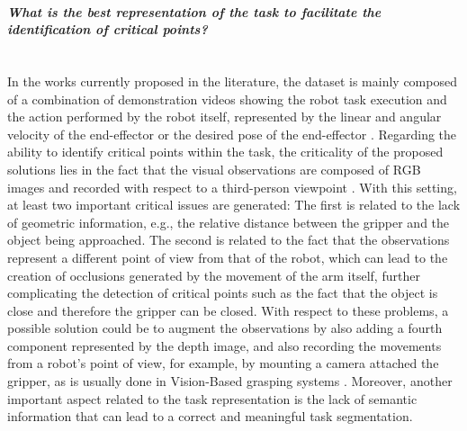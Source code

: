 \paragraph{\textit{What is the best representation of the task to facilitate the identification of critical points?}}  \mbox{} \\
In the works currently proposed in the literature, the dataset is mainly composed of a combination of demonstration videos showing the robot task execution and the action performed by the robot itself, represented by the linear and angular velocity of the end-effector \cite{yu2018daml} or the desired pose of the end-effector \cite{dasari2021transformers_one_shot,jang2022bc_z}. Regarding the ability to identify critical points within the task, the criticality of the proposed solutions lies in the fact that the visual observations are composed of RGB images and recorded with respect to a third-person viewpoint \cite{yu2018daml,jang2022bc_z}. With this setting, at least two important critical issues are generated: The first is related to the lack of geometric information, e.g., the relative distance between the gripper and the object being approached. The second is related to the fact that the observations represent a different point of view from that of the robot, which can lead to the creation of occlusions generated by the movement of the arm itself, further complicating the detection of critical points such as the fact that the object is close and therefore the gripper can be closed. With respect to these problems, a possible solution could be to augment the observations by also adding a fourth component represented by the depth image, and also recording the movements from a robot's point of view, for example, by mounting a camera attached the gripper, as is usually done in Vision-Based grasping systems \cite{fang2020graspnet}.
\newline Moreover, another important aspect related to the task representation is the lack of semantic information that can lead to a correct and meaningful task segmentation.
